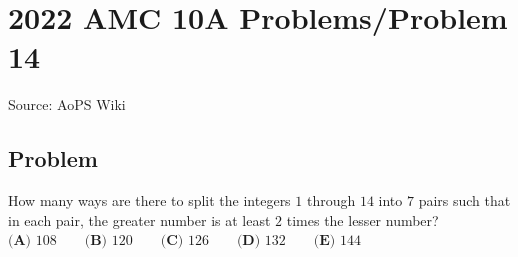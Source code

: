 \documentclass[12pt]{article}
\begin{document}
\section*{{2022 AMC 10A Problems/Problem 14}}
Source: AoPS Wiki

\subsection*{Problem}
How many ways are there to split the integers $1$ through $14$ into $7$ pairs such that in each pair, the greater number is at least $2$ times the lesser number? $\textbf{(A) } 108 \qquad \textbf{(B) } 120 \qquad \textbf{(C) } 126 \qquad \textbf{(D) } 132 \qquad \textbf{(E) } 144$
\end{document}

